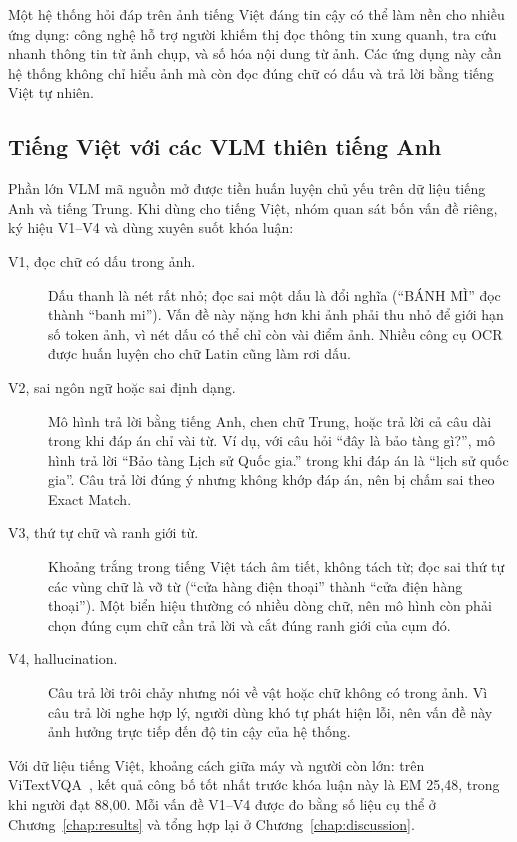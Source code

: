 Một hệ thống hỏi đáp trên ảnh tiếng Việt đáng tin cậy có thể làm nền cho nhiều
ứng dụng: công nghệ hỗ trợ người khiếm thị đọc thông tin xung quanh, tra cứu
nhanh thông tin từ ảnh chụp, và số hóa nội dung từ ảnh. Các ứng dụng này cần hệ
thống không chỉ hiểu ảnh mà còn đọc đúng chữ có dấu và trả lời bằng tiếng Việt
tự nhiên.

\subsection{Tiếng Việt với các VLM thiên tiếng Anh}

Phần lớn VLM mã nguồn mở được tiền huấn luyện chủ yếu trên dữ liệu tiếng Anh và
tiếng Trung. Khi dùng cho tiếng Việt, nhóm quan sát bốn vấn đề riêng, ký hiệu
V1--V4 và dùng xuyên suốt khóa luận:

\begin{description}
  \item[V1, đọc chữ có dấu trong ảnh.] Dấu thanh là nét rất nhỏ; đọc sai một
  dấu là đổi nghĩa (``BÁNH MÌ'' đọc thành ``banh mi''). Vấn đề này nặng hơn khi
  ảnh phải thu nhỏ để giới hạn số token ảnh, vì nét dấu có thể chỉ còn vài điểm
  ảnh. Nhiều công cụ OCR được huấn luyện cho chữ Latin cũng làm rơi dấu.
  \item[V2, sai ngôn ngữ hoặc sai định dạng.] Mô hình trả lời bằng tiếng Anh,
  chen chữ Trung, hoặc trả lời cả câu dài trong khi đáp án chỉ vài từ. Ví dụ, với
  câu hỏi ``đây là bảo tàng gì?'', mô hình trả lời ``Bảo tàng Lịch sử Quốc gia.''
  trong khi đáp án là ``lịch sử quốc gia''. Câu trả lời đúng ý nhưng không khớp
  đáp án, nên bị chấm sai theo Exact Match.
  \item[V3, thứ tự chữ và ranh giới từ.] Khoảng trắng trong tiếng Việt tách âm
  tiết, không tách từ; đọc sai thứ tự các vùng chữ là vỡ từ (``cửa hàng điện
  thoại'' thành ``cửa điện hàng thoại''). Một biển hiệu thường có nhiều dòng chữ,
  nên mô hình còn phải chọn đúng cụm chữ cần trả lời và cắt đúng ranh giới của
  cụm đó.
  \item[V4, hallucination.] Câu trả lời trôi chảy nhưng nói về vật hoặc chữ
  không có trong ảnh. Vì câu trả lời nghe hợp lý, người dùng khó tự phát hiện
  lỗi, nên vấn đề này ảnh hưởng trực tiếp đến độ tin cậy của hệ thống.
\end{description}

Với dữ liệu tiếng Việt, khoảng cách giữa máy và người còn lớn: trên
ViTextVQA~\cite{nguyen2024vitextvqa}, kết quả công bố tốt nhất trước khóa luận
này là EM 25,48, trong khi người đạt 88,00. Mỗi vấn đề V1--V4 được đo bằng số
liệu cụ thể ở Chương~\ref{chap:results} và tổng hợp lại ở
Chương~\ref{chap:discussion}.

